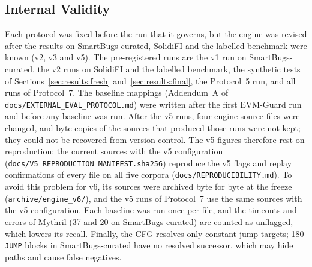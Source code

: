 \documentclass[pdflatex,sn-mathphys]{sn-jnl}
\theoremstyle{thmstyletwo}
\theoremstyle{thmstyletwo}
\begin{document}
\subsection{Internal Validity}\label{sec:threats:internal}
Each protocol was fixed before the run that it governs, but the engine was revised after the results on SmartBugs-curated, SolidiFI and the labelled benchmark were known (v2, v3 and v5). The pre-registered runs are the v1 run on SmartBugs-curated, the v2 runs on SolidiFI and the labelled benchmark, the synthetic tests of Sections~\ref{sec:results:fresh} and~\ref{sec:results:final}, the Protocol~5 run, and all runs of Protocol~7. The baseline mappings (Addendum~A of \texttt{docs/EXTERNAL\_EVAL\_PROTOCOL.md}) were written after the first EVM-Guard run and before any baseline was run. After the v5 runs, four engine source files were changed, and byte copies of the sources that produced those runs were not kept; they could not be recovered from version control. The v5 figures therefore rest on reproduction: the current sources with the v5 configuration (\texttt{docs/V5\_REPRODUCTION\_MANIFEST.sha256}) reproduce the v5 flags and replay confirmations of every file on all five corpora (\texttt{docs/REPRODUCIBILITY.md}). To avoid this problem for v6, its sources were archived byte for byte at the freeze (\texttt{archive/engine\_v6/}), and the v5 runs of Protocol~7 use the same sources with the v5 configuration. Each baseline was run once per file, and the timeouts and errors of Mythril (37 and 20 on SmartBugs-curated) are counted as unflagged, which lowers its recall. Finally, the CFG resolves only constant jump targets; 180 \texttt{JUMP} blocks in SmartBugs-curated have no resolved successor, which may hide paths and cause false negatives.
\end{document}
